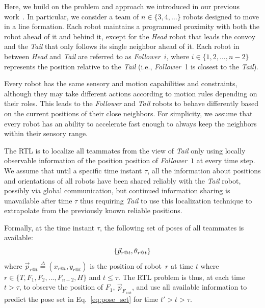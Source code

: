 \documentclass[letterpaper, 10 pt, conference]{ieeeconf}  %
\begin{document}
    Here, we build on the problem and approach we introduced in our previous
    work~\cite{CPR17}. In particular, we consider a team of $n \in
    \{3,4,\dots\}$ robots designed to move in a line formation.
    Each robot maintains a programmed
    proximity with both the robot ahead of it and behind it, except for
    the \emph{Head} robot that leads the convoy and the \emph{Tail}
    that only follows its single neighbor ahead of it. Each robot in
    between \emph{Head} and \emph{Tail} are referred to as
    \emph{Follower}~$i$, where $i \in \{1, 2, \dots, n-2\}$ represents
    the position relative to the \emph{Tail} (i.e., \emph{Follower}~1 is
    closest to the \emph{Tail}).

    Every robot has the same sensory and motion capabilities and
    constraints, although they may take different actions according to
    motion rules depending on their roles. This leads to the
    \emph{Follower} and \emph{Tail} robots to behave differently based
    on the current positions of their close neighbors. For simplicity,
    we assume that every robot has an ability to accelerate fast enough
    to always keep the neighbors within their sensory range.

    The RTL is to localize all teammates from the view of \emph{Tail}
    only using locally observable information of the position position
    of \emph{Follower}~$1$ at every time step. We assume that until a
    specific time instant $\tau$, all the information about positions
    and orientations of all robots have been shared reliably with the
    \emph{Tail} robot, possibly via global communication, but continued
    information sharing is unavailable after time $\tau$ thus requiring
    \emph{Tail} to use this localization technique to extrapolate from
    the previously known reliable positions.

    Formally, at the time instant $\tau$, the following set of poses of
    all teammates is available:
	\begin{equation}
		\{\vec{p}_{r@t},\theta_{r@t}\} \\
	    \label{eq:pose_set}
	\end{equation}
    where $\vec{p}_{r@t} \overset{\Delta}{=}(x_{r@t}, y_{r@t})$ is the
    position of robot~$r$ at time $t$ where  $r \in \{T, F_{1}, F_{2},
    ..., F_{n-2}, H\}$ and $t \leq \tau$. The RTL problem is thus, at
    each time $t > \tau$, to observe the position of $F_1$,
    $\vec{p}_{F_{1@t}}$, and use all available information to predict
    the pose set in Eq.~\eqref{eq:pose_set} for time $t' > t > \tau$.
\end{document}

